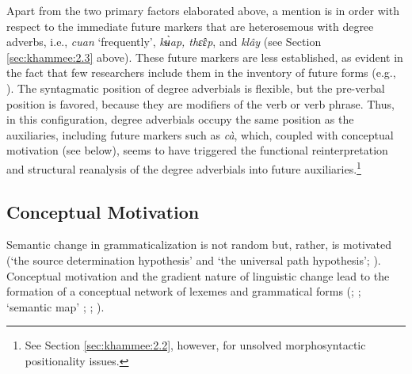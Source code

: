 \documentclass[output=paper,colorlinks,citecolor=brown]{langscibook}
\begin{document}
Apart from the two primary factors elaborated above, a mention is in order with respect to the immediate future markers that are heterosemous with degree adverbs, i.e., \textit{cuan} ‘frequently’,\textit{ kʉ̀ap, thɛ̂ɛp}, and \textit{klây} (see Section \ref{sec:khammee:2.3} above). These future markers are less established, as evident in the fact that few researchers include them in the inventory of future forms (e.g., \cite{Supanvanich1973}). The syntagmatic position of degree adverbials is flexible, but the pre-verbal position is favored, because they are modifiers of the verb or verb phrase. Thus, in this configuration, degree adverbials occupy the same position as the auxiliaries, including future markers such as \textit{cà}, which, coupled with conceptual motivation (see below), seems to have triggered the functional reinterpretation and structural reanalysis of the degree adverbials into future auxiliaries.\footnote{See Section \ref{sec:khammee:2.2}, however, for unsolved morphosyntactic positionality issues.}



\subsection{Conceptual Motivation}\label{sec:khammee:3.2}

Semantic change in grammaticalization is not random but, rather, is motivated (‘the source determination hypothesis’ and ‘the universal path hypothesis’; \cite{BybeePerkinsPagliuca1994}). Conceptual motivation and the gradient nature of linguistic change lead to the formation of a conceptual network of lexemes and grammatical forms (\cite{HeineClaudiHunnemeyer1991}; \cite{Nuyts1992}; ‘semantic map’ \cite{vanderAuwera1998}; \cite{Croft2001}; \cite{Narrog2009}). 
\end{document}
